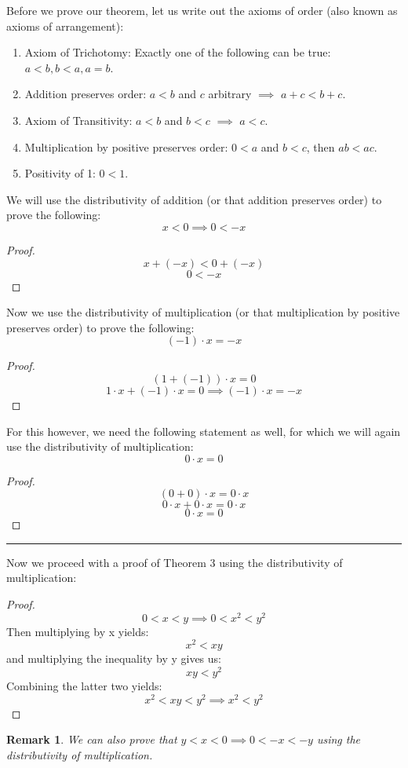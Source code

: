 \documentclass{article}
\newtheorem{remark}{Remark}
\begin{document}
Before we prove our theorem, let us write out the axioms of order (also known as axioms of arrangement):
\begin{enumerate}
    \item Axiom of Trichotomy: Exactly one of the following can be true: $a < b, b < a, a = b$.
    \item Addition preserves order: $a < b$ and $c$ arbitrary $\implies$ $a + c < b + c$.
    \item  Axiom of Transitivity: $a < b$ and $b < c$ $\implies$ $a < c$.
    \item Multiplication by positive preserves order: $0 < a$ and $b < c$, then $ab < ac$.
    \item Positivity of 1: $0 < 1$.
\end{enumerate}
We will use the distributivity of addition (or that addition preserves order) to prove the following:
\[
    x < 0 \implies 0 < -x
\]
\begin{proof}
\[
    x + (-x) < 0 + (-x)
\]
\[
    0 < -x
\]
\end{proof}
Now we use the distributivity of multiplication (or that multiplication by positive preserves order) to prove the following:
\[
    (-1)\cdot x = -x
\]
\begin{proof}
\[
    (1 + (-1)) \cdot x = 0
\]
\[
    1 \cdot x + (-1) \cdot x = 0 \implies (-1) \cdot x = -x
\]
\end{proof}
For this however, we need the following statement as well, for which we will again use the distributivity of multiplication:
\[
    0\cdot x = 0
\]
\begin{proof}
\[
    (0+0) \cdot x = 0 \cdot x
\]
\[
    0 \cdot x + 0 \cdot x = 0 \cdot x
\]
\[
    0 \cdot x = 0
\]
\end{proof}

\hrule
\vspace{1em}

Now we proceed with a proof of Theorem 3 using the distributivity of multiplication:

\begin{proof}
    \[
    0 < x < y \implies 0 < x^2 < y^2
    \]
    Then multiplying by x yields:
    \[
    x^2 < xy
    \]
    and multiplying the inequality by y gives us:
    \[
    xy < y^2
    \]
    Combining the latter two yields:
    \[
    x^2 < xy < y^2 \implies x^2 < y^2
    \]
\end{proof}

\begin{remark}
    We can also prove that $y < x < 0 \implies 0 < -x < -y$ using the distributivity of multiplication.
\end{remark}
\end{document}
